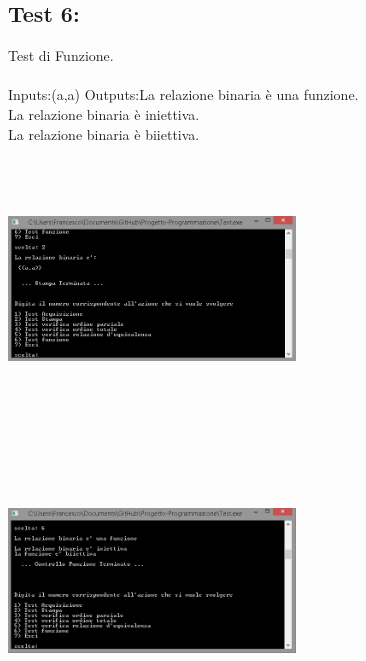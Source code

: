 \documentclass[11pt, a4paper, titlepage, block]{article}
\begin{document}
	\subsection{Test 6:}
	Test di Funzione.\\
	\\
	Inputs:(a,a)
	Outputs:La relazione binaria \`e  una funzione.\\
	La relazione binaria \`e  iniettiva.\\
	La relazione binaria \`e  biiettiva.\\
	\includegraphics[width=3in,height=3in,viewport=0 0 300 300]{../Screenshots/Test6Input.png}
	\\
	\includegraphics[width=3in,height=3in,viewport=0 0 300 300]{../Screenshots/Test6Output.png}
	\\
	\\
	\newpage
\end{document}
